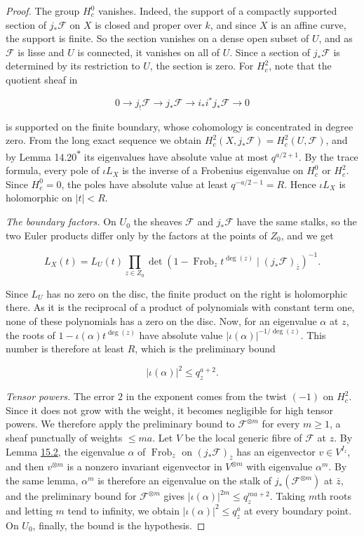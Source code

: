 \documentclass[11pt]{article}
\newcommand{\bpout}[1]{#1\textsuperscript{\hyperlink{bp-outside}{\ensuremath{\ast}}}}
\begin{document}
\begin{proof}[{Proof}]
The group \(H^0_c\) vanishes. Indeed, the support of a compactly supported section of \(j_*\mathcal F\) on \(X\) is closed and proper over \(k\), and since \(X\) is an affine curve, the support is finite. So the section vanishes on a dense open subset of \(U\), and as \(\mathcal F\) is lisse and \(U\) is connected, it vanishes on all of \(U\). Since a section of \(j_*\mathcal F\) is determined by its restriction to \(U\), the section is zero. For \(H^2_c\), note that the quotient sheaf in

\[
0\longrightarrow j_!\mathcal F\longrightarrow j_*\mathcal F
\longrightarrow i_*i^*j_*\mathcal F\longrightarrow0
\]

is supported on the finite boundary, whose cohomology is concentrated in degree zero.  From the long exact sequence we obtain \(H_c^2(X,j_*\mathcal F)=H_c^2(U,\mathcal F)\), and by Lemma \bpout{14.20} its eigenvalues have absolute value at most \(q^{a/2+1}\).  By the trace formula, every pole of \(\iota L_X\) is the inverse of a Frobenius eigenvalue on \(H^0_c\) or \(H^2_c\). Since \(H^0_c=0\), the poles have absolute value at least \(q^{-a/2-1}=R\). Hence \(\iota L_X\) is holomorphic on \(|t|<R\).

\emph{The boundary factors.} On \(U_0\) the sheaves \(\mathcal F\) and \(j_*\mathcal F\) have the same stalks, so the two Euler products differ only by the factors at the points of \(Z_0\), and we get

\[
L_X(t)=L_U(t)\prod_{z\in Z_0}
\det(1-\operatorname{Frob}_z t^{\deg(z)}\mid(j_*\mathcal F)_{\bar z})^{-1}.
\]

Since \(L_U\) has no zero on the disc, the finite product on the right is holomorphic there. As it is the reciprocal of a product of polynomials with constant term one, none of these polynomials has a zero on the disc.  Now, for an eigenvalue \(\alpha\) at \(z\), the roots of \(1-\iota(\alpha)t^{\deg(z)}\) have absolute value \(|\iota(\alpha)|^{-1/\deg(z)}\). This number is therefore at least \(R\), which is the preliminary bound

\[
|\iota(\alpha)|^2\le q_z^{a+2}.
\]

\emph{Tensor powers.} The error \(2\) in the exponent comes from the twist \((-1)\) on \(H^2_c\). Since it does not grow with the weight, it becomes negligible for high tensor powers. We therefore apply the preliminary bound to \(\mathcal F^{\otimes m}\) for every \(m\ge1\), a sheaf punctually of weights \(\le ma\).  Let \(V\) be the local generic fibre of \(\mathcal F\) at \(z\). By Lemma \hyperref[bp6]{15.2}, the eigenvalue \(\alpha\) of \(\operatorname{Frob}_z\) on \((j_*\mathcal F)_{\bar z}\) has an eigenvector \(v\in V^{I_z}\), and then \(v^{\otimes m}\) is a nonzero invariant eigenvector in \(V^{\otimes m}\) with eigenvalue \(\alpha^m\). By the same lemma, \(\alpha^m\) is therefore an eigenvalue on the stalk of \(j_*(\mathcal F^{\otimes m})\) at \(\bar z\), and the preliminary bound for \(\mathcal F^{\otimes m}\) gives \(|\iota(\alpha)|^{2m}\le q_z^{ma+2}\).  Taking \(m\)th roots and letting \(m\) tend to infinity, we obtain \(|\iota(\alpha)|^2\le q_z^a\) at every boundary point. On \(U_0\), finally, the bound is the hypothesis.
\end{proof}
\end{document}
